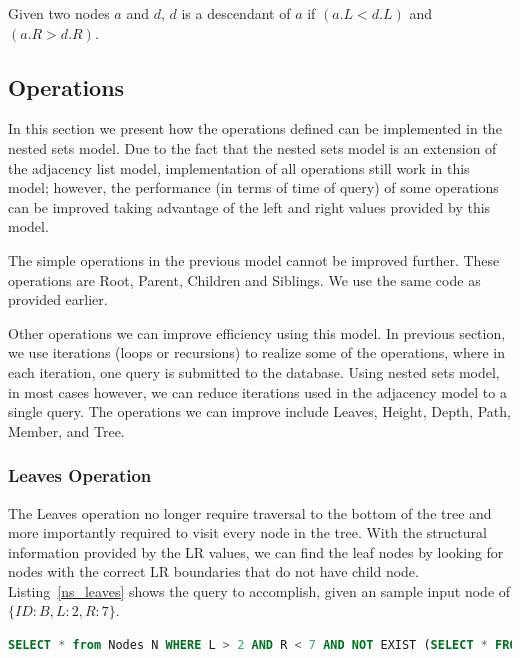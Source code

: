 \begin{property}\label{p_ns_desc}
Given two nodes $a$ and $d$, $d$ is a descendant of $a$ if $(a.L < d.L)$ and $(a.R > d.R)$.
\end{property}


\subsection{Operations}

In this section we present how the operations defined can be implemented in the nested sets model. Due to the fact that the nested sets model is an extension of the adjacency list model, implementation of all operations still work in this model; however, the performance (in terms of time of query) of some operations can be improved taking advantage of the left and right values provided by this model.

The simple operations in the previous model cannot be improved further. These operations are Root, Parent, Children and Siblings. We use the same code as provided earlier.


Other operations we can improve efficiency using this model. In previous section, we use iterations (loops or recursions) to realize some of the operations, where in each iteration, one query is submitted to the database. Using nested sets model, in most cases however, we can reduce iterations used in the adjacency model to a single query. The operations we can improve include Leaves, Height, Depth, Path, Member, and Tree.

\subsubsection{Leaves Operation}

The Leaves operation no longer require traversal to the bottom of the tree and more importantly required to visit every node in the tree. With the structural information provided by the LR values, we can find the leaf nodes by looking for nodes with the correct LR boundaries that do not have child node. Listing~\ref{ns_leaves} shows the query to accomplish, given an sample input node of $\{ID:B, L:2, R:7\}$.

\begin{lstlisting}[language=sql,caption={Nested Sets Leaves Operation},label=ns_leaves, float]
SELECT * from Nodes N WHERE L > 2 AND R < 7 AND NOT EXIST (SELECT * FROM Nodes WHERE Parent=N.ID) 
\end{lstlisting}

